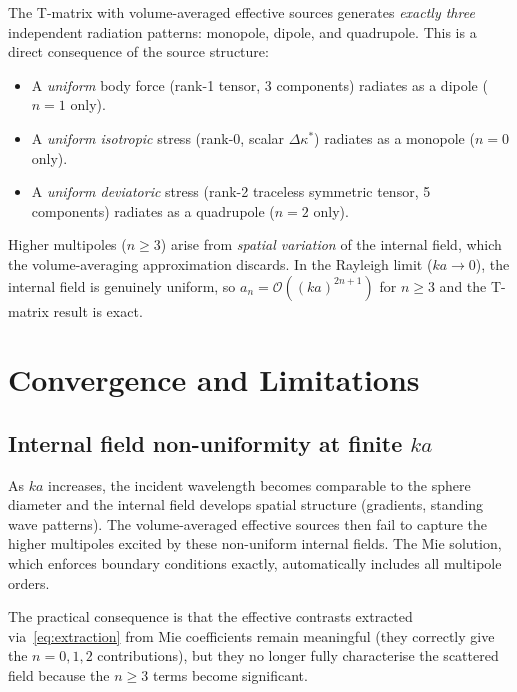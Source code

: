 \documentclass[11pt,a4paper]{article}
\newcommand{\order}[1]{\mathcal{O}\!\left(#1\right)}
\newcommand{\Dkappa}{\Delta\kappa}
\begin{document}
The T-matrix with volume-averaged effective sources generates
\emph{exactly three} independent radiation patterns: monopole, dipole,
and quadrupole.  This is a direct consequence of the source structure:
\begin{itemize}
  \item A \emph{uniform} body force (rank-1 tensor, 3 components)
    radiates as a dipole ($n = 1$ only).
  \item A \emph{uniform isotropic} stress (rank-0, scalar $\Dkappa^*$)
    radiates as a monopole ($n = 0$ only).
  \item A \emph{uniform deviatoric} stress (rank-2 traceless symmetric
    tensor, 5 components) radiates as a quadrupole ($n = 2$ only).
\end{itemize}
Higher multipoles ($n \geq 3$) arise from \emph{spatial variation}
of the internal field, which the volume-averaging approximation discards.
In the Rayleigh limit ($ka \to 0$), the internal field is genuinely
uniform, so $a_n = \order{(ka)^{2n+1}}$ for $n \geq 3$ and the
T-matrix result is exact.

\section{Convergence and Limitations}
\label{sec:convergence}

\subsection{Internal field non-uniformity at finite \texorpdfstring{$ka$}{ka}}

As $ka$ increases, the incident wavelength becomes comparable to
the sphere diameter and the internal field develops spatial structure
(gradients, standing wave patterns).  The volume-averaged effective
sources then fail to capture the higher multipoles excited by these
non-uniform internal fields.  The Mie solution, which enforces
boundary conditions exactly, automatically includes all multipole
orders.

The practical consequence is that the effective contrasts extracted
via~\eqref{eq:extraction} from Mie coefficients remain meaningful
(they correctly give the $n = 0, 1, 2$ contributions), but they no
longer fully characterise the scattered field because the $n \geq 3$
terms become significant.
\end{document}
